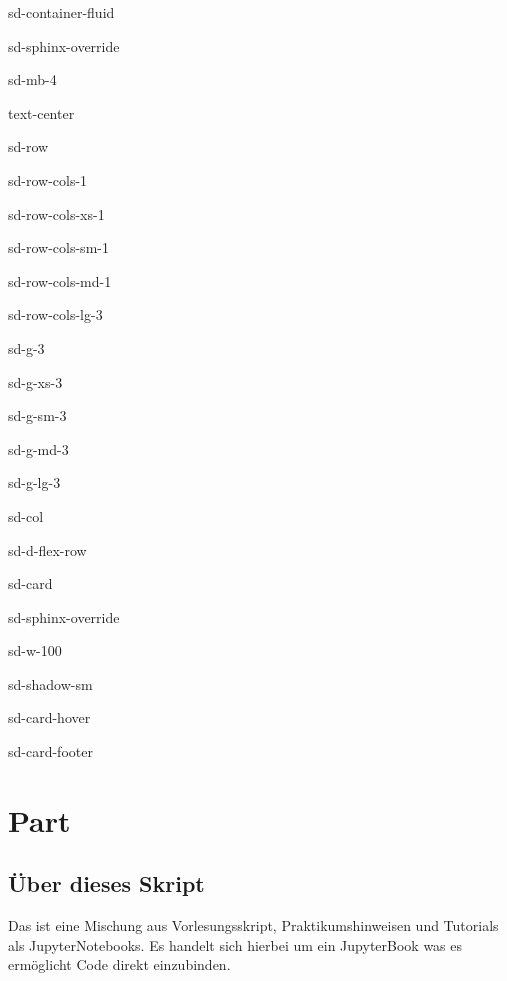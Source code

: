 \documentclass[letterpaper,10pt,english]{jupyterBook}
\begin{document}
\begin{sphinxuseclass}{sd-container-fluid}
\begin{sphinxuseclass}{sd-sphinx-override}
\begin{sphinxuseclass}{sd-mb-4}
\begin{sphinxuseclass}{text-center}
\begin{sphinxuseclass}{sd-row}
\begin{sphinxuseclass}{sd-row-cols-1}
\begin{sphinxuseclass}{sd-row-cols-xs-1}
\begin{sphinxuseclass}{sd-row-cols-sm-1}
\begin{sphinxuseclass}{sd-row-cols-md-1}
\begin{sphinxuseclass}{sd-row-cols-lg-3}
\begin{sphinxuseclass}{sd-g-3}
\begin{sphinxuseclass}{sd-g-xs-3}
\begin{sphinxuseclass}{sd-g-sm-3}
\begin{sphinxuseclass}{sd-g-md-3}
\begin{sphinxuseclass}{sd-g-lg-3}
\begin{sphinxuseclass}{sd-col}
\begin{sphinxuseclass}{sd-d-flex-row}
\begin{sphinxuseclass}{sd-card}
\begin{sphinxuseclass}{sd-sphinx-override}
\begin{sphinxuseclass}{sd-w-100}
\begin{sphinxuseclass}{sd-shadow-sm}
\begin{sphinxuseclass}{sd-card-hover}
\begin{sphinxuseclass}{sd-card-footer}
\end{sphinxuseclass}
\end{sphinxuseclass}
\end{sphinxuseclass}
\end{sphinxuseclass}
\end{sphinxuseclass}
\end{sphinxuseclass}
\end{sphinxuseclass}
\end{sphinxuseclass}
\end{sphinxuseclass}
\end{sphinxuseclass}
\end{sphinxuseclass}
\end{sphinxuseclass}
\end{sphinxuseclass}
\end{sphinxuseclass}
\end{sphinxuseclass}
\end{sphinxuseclass}
\end{sphinxuseclass}
\end{sphinxuseclass}
\end{sphinxuseclass}
\end{sphinxuseclass}
\end{sphinxuseclass}
\end{sphinxuseclass}
\end{sphinxuseclass}
\sphinxstepscope


\part{Part}

\sphinxstepscope


\chapter{Über dieses Skript}
\label{\detokenize{content/00_jupyter:uber-dieses-skript}}\label{\detokenize{content/00_jupyter::doc}}
\sphinxAtStartPar
Das  ist eine Mischung aus Vorlesungsskript, Praktikumshinweisen und Tutorials als Jupyter\sphinxhyphen{}Notebooks. Es handelt sich hierbei um ein Jupyter\sphinxhyphen{}Book was es ermöglicht \sphinxhyphen{}Code direkt einzubinden.
\end{document}
